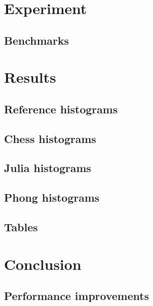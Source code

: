 \documentclass{beamer}
\begin{document}
	\section{Experiment}
	\subsection{Benchmarks}
	

	\section{Results}
	\subsection{Reference histograms}
	
	\subsection{Chess histograms}
	
	\subsection{Julia histograms}
	
	\subsection{Phong histograms}
	

	\subsection{Tables}
	

	\section{Conclusion}
	\subsection{Performance improvements}
	
\end{document}
